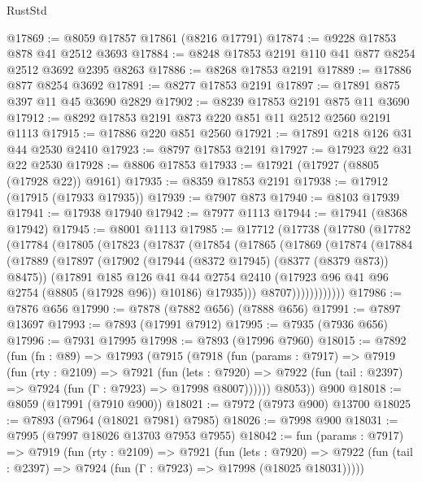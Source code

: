 \begin{lexlean}{RustStd}
\begin{coremodule}
@17869 := @8059 @17857 @17861 (@8216 @17791)
@17874 := @9228 @17853 @878 @41 @2512 @3693
@17884 := @8248 @17853 @2191 @110 @41 @877 @8254 @2512 @3692 @2395 @8263
@17886 := @8268 @17853 @2191
@17889 := @17886 @877 @8254 @3692
@17891 := @8277 @17853 @2191
@17897 := @17891 @875 @397 @11 @45 @3690 @2829
@17902 := @8239 @17853 @2191 @875 @11 @3690
@17912 := @8292 @17853 @2191 @873 @220 @851 @11 @2512 @2560 @2191 @1113
@17915 := @17886 @220 @851 @2560
@17921 := @17891 @218 @126 @31 @44 @2530 @2410
@17923 := @8797 @17853 @2191
@17927 := @17923 @22 @31 @22 @2530
@17928 := @8806 @17853
@17933 := @17921 (@17927 (@8805 (@17928 @22)) @9161)
@17935 := @8359 @17853 @2191
@17938 := @17912 (@17915 (@17933 @17935))
@17939 := @7907 @873
@17940 := @8103 @17939
@17941 := @17938 @17940
@17942 := @7977 @1113
@17944 := @17941 (@8368 @17942)
@17945 := @8001 @1113
@17985 := @17712
    (@17738
      (@17780
        (@17782
          (@17784
            (@17805
              (@17823
                (@17837
                  (@17854
                    (@17865
                      (@17869
                        (@17874
                          (@17884
                            (@17889
                              (@17897
                                (@17902 (@17944 (@8372 @17945) (@8377 (@8379 @873)) @8475))
                                (@17891
                                  @185
                                  @126
                                  @41
                                  @44
                                  @2754
                                  @2410
                                  (@17923 @96 @41 @96 @2754 (@8805 (@17928 @96)) @10186)
                                  @17935)))
                            @8707))))))))))))
@17986 := @7876 @656
@17990 := @7878 (@7882 @656) (@7888 @656)
@17991 := @7897 @13697
@17993 := @7893 (@17991 @7912)
@17995 := @7935 (@7936 @656)
@17996 := @7931 @17995
@17998 := @7893 (@17996 @7960)
@18015 := @7892
    (fun (fn : @89) =>
    @17993
      (@7915
        (@7918
          (fun (params : @7917) =>
          @7919
            (fun (rty : @2109) =>
            @7921
              (fun (lets : @7920) =>
              @7922 (fun (tail : @2397) => @7924 (fun (Γ : @7923) => @17998 @8007))))))
        @8053))
    @900
@18018 := @8059 (@17991 (@7910 @900))
@18021 := @7972 (@7973 @900) @13700
@18025 := @7893 (@7964 (@18021 @7981) @7985)
@18026 := @7998 @900
@18031 := @7995 (@7997 @18026 @13703 @7953 @7955)
@18042 := fun (params : @7917) =>
  @7919
    (fun (rty : @2109) =>
    @7921
      (fun (lets : @7920) =>
      @7922 (fun (tail : @2397) => @7924 (fun (Γ : @7923) => @17998 (@18025 @18031)))))

\end{coremodule}
\end{lexlean}
